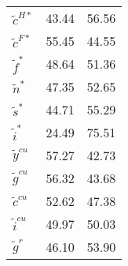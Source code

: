 \begin{center}
\begin{longtable}{lcc}
${\tilde c^{H*}}       $	 & 	             43.44	 & 	             56.56 \\ 
${\tilde c^{F*}}       $	 & 	             55.45	 & 	             44.55 \\ 
${\tilde f^*}          $	 & 	             48.64	 & 	             51.36 \\ 
${\tilde n^*}          $	 & 	             47.35	 & 	             52.65 \\ 
${\tilde s^*}          $	 & 	             44.71	 & 	             55.29 \\ 
${\tilde i^*}          $	 & 	             24.49	 & 	             75.51 \\ 
${\tilde y^{cu}}       $	 & 	             57.27	 & 	             42.73 \\ 
${\tilde g^{cu}}       $	 & 	             56.32	 & 	             43.68 \\ 
${\tilde c^{cu}}       $	 & 	             52.62	 & 	             47.38 \\ 
${\tilde i^{cu}}       $	 & 	             49.97	 & 	             50.03 \\ 
${\tilde g^{r}}        $	 & 	             46.10	 & 	             53.90 \\ 
\end{longtable}
 \end{center}
